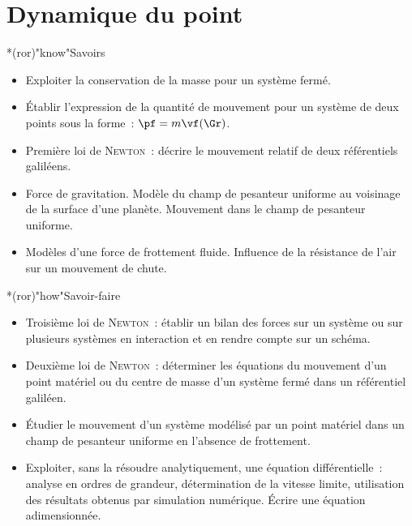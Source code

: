 \documentclass[../../main/main.tex]{subfiles}
\begin{document}
\setcounter{chapter}{1}
\chapter{Dynamique du point}

\vfill

\begin{prgm}
	\begin{tcb}*(ror)"know"{Savoirs}
		\begin{itemize}
			\item Exploiter la conservation de la masse pour un système fermé.
			\item Établir l’expression de la quantité de mouvement pour un système de
			      deux points sous la forme~: $\pf=m\vf(\Gr)$.
			\item Première loi de \textsc{Newton}~: décrire le mouvement relatif de
			      deux référentiels galiléens.
			\item Force de gravitation. Modèle du champ de pesanteur uniforme au
			      voisinage de la surface d’une planète. Mouvement dans le champ de
			      pesanteur uniforme.
			\item Modèles d’une force de frottement fluide. Influence de la résistance
			      de l’air sur un mouvement de chute.
		\end{itemize}
	\end{tcb}
	\begin{tcb}*(ror)"how"{Savoir-faire}
		\begin{itemize}
			\item Troisième loi de \textsc{Newton}~: établir un bilan des forces sur un
			      système ou sur plusieurs systèmes en interaction et en rendre compte
			      sur un schéma.
			\item Deuxième loi de \textsc{Newton}~: déterminer les équations du
			      mouvement d’un point matériel ou du centre de masse d’un système fermé
			      dans un référentiel galiléen.
			\item Étudier le mouvement d’un système modélisé par un point matériel
			      dans un champ de pesanteur uniforme en l’absence de frottement.
			\item Exploiter, sans la résoudre analytiquement, une équation
			      différentielle~: analyse en ordres de grandeur, détermination de la
			      vitesse limite, utilisation des résultats obtenus par simulation
			      numérique. Écrire une équation adimensionnée.
		\end{itemize}
	\end{tcb}
\end{prgm}
\end{document}
